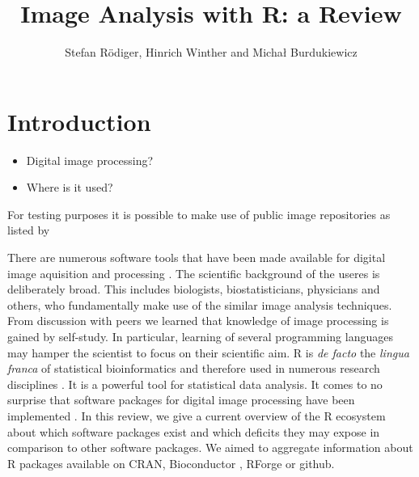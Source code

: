 \title{Image Analysis with R: a Review}
\author{Stefan R\"{o}diger, Hinrich Winther and Micha\l{} Burdukiewicz}

\maketitle


\section{Introduction}

\begin{itemize}
\item Digital image processing?
\item Where is it used?
\end{itemize}

For testing purposes it is possible to make use of public image repositories as listed by \citet{eliceiri_biological_2012}


There are numerous software tools that have been made available for digital 
image aquisition and processing \citep{wiesmann_review_2015, chieco_image_2013, eliceiri_biological_2012}. 
The scientific background of the useres is deliberately broad. This includes 
biologists, biostatisticians, physicians and others, who fundamentally make use 
of the similar image analysis techniques. From discussion with peers we learned 
that knowledge of image processing is gained by self-study. In particular, 
learning of several programming languages may hamper the scientist to focus on 
their scientific aim. R \citep{R} is \textit{de facto} the \textit{lingua 
franca} of statistical bioinformatics and therefore used in numerous research 
disciplines \citep{rodiger_r_2015}. It is a powerful tool for statistical data 
analysis. It comes to no surprise that software packages for digital image 
processing have been implemented \citep{frery_introduction_2013}. In this 
review, we give a current overview of the R ecosystem about which software 
packages exist and which deficits they may expose in comparison to other 
software packages. We aimed to aggregate information about R packages available 
on CRAN, Bioconductor \citep{gentleman_bioconductor:_2004}, RForge or github.

